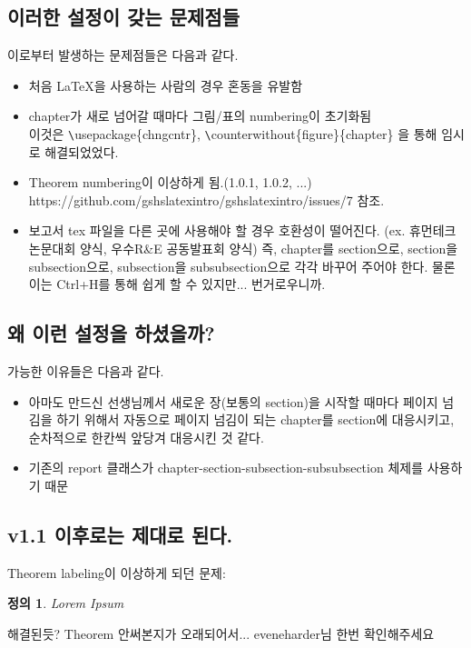 \documentclass{gshs-report-v1.1}
\newtheorem{definition}{정의}
\begin{document}
\subsection{이러한 설정이 갖는 문제점들}
이로부터 발생하는 문제점들은 다음과 같다.
\begin{itemize}
\item 처음 \LaTeX 을 사용하는 사람의 경우 혼동을 유발함
\item chapter가 새로 넘어갈 때마다 그림/표의 numbering이 초기화됨 \\
이것은 \verb+\+usepackage\{chngcntr\}, \verb+\+counterwithout\{figure\}\{chapter\} 을 통해 임시로 해결되었었다.
\item Theorem numbering이 이상하게 됨.(1.0.1,  1.0.2, ...) \\
https://github.com/gshslatexintro/gshslatexintro/issues/7 참조.
\item 보고서 tex 파일을 다른 곳에 사용해야 할 경우 호환성이 떨어진다. (ex. 휴먼테크논문대회 양식, 우수R\&E 공동발표회 양식) 즉, chapter를 section으로, section을 subsection으로, subsection을 subsubsection으로 각각 바꾸어 주어야 한다. 물론 이는 Ctrl+H를 통해 쉽게 할 수 있지만... 번거로우니까.
\end{itemize}

\subsection{왜 이런 설정을 하셨을까?}
가능한 이유들은 다음과 같다.
\begin{itemize}
	\item 아마도 만드신 선생님께서 새로운 장(보통의 section)을 시작할 때마다 페이지 넘김을 하기 위해서 자동으로 페이지 넘김이 되는 chapter를 section에 대응시키고, 순차적으로 한칸씩 앞당겨 대응시킨 것 같다. 
	\item 기존의 report 클래스가 chapter-section-subsection-subsubsection 체제를 사용하기 때문
\end{itemize}

\subsection{v1.1 이후로는 제대로 된다.}
Theorem labeling이 이상하게 되던 문제:
\begin{definition}
	Lorem Ipsum
\end{definition}
해결된듯? Theorem 안써본지가 오래되어서... eveneharder님 한번 확인해주세요
\end{document}
